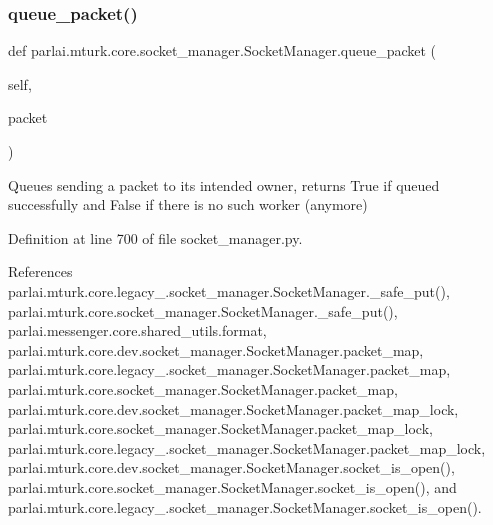 \subsubsection{\texorpdfstring{queue\+\_\+packet()}{queue\_packet()}}
{\footnotesize\ttfamily def parlai.\+mturk.\+core.\+socket\+\_\+manager.\+Socket\+Manager.\+queue\+\_\+packet (\begin{DoxyParamCaption}\item[{}]{self,  }\item[{}]{packet }\end{DoxyParamCaption})}

\begin{DoxyVerb}Queues sending a packet to its intended owner, returns True if
queued successfully and False if there is no such worker (anymore)
\end{DoxyVerb}
 

Definition at line 700 of file socket\+\_\+manager.\+py.



References parlai.\+mturk.\+core.\+legacy\+\_.\+socket\+\_\+manager.\+Socket\+Manager.\+\_\+safe\+\_\+put(), parlai.\+mturk.\+core.\+socket\+\_\+manager.\+Socket\+Manager.\+\_\+safe\+\_\+put(), parlai.\+messenger.\+core.\+shared\+\_\+utils.\+format, parlai.\+mturk.\+core.\+dev.\+socket\+\_\+manager.\+Socket\+Manager.\+packet\+\_\+map, parlai.\+mturk.\+core.\+legacy\+\_.\+socket\+\_\+manager.\+Socket\+Manager.\+packet\+\_\+map, parlai.\+mturk.\+core.\+socket\+\_\+manager.\+Socket\+Manager.\+packet\+\_\+map, parlai.\+mturk.\+core.\+dev.\+socket\+\_\+manager.\+Socket\+Manager.\+packet\+\_\+map\+\_\+lock, parlai.\+mturk.\+core.\+socket\+\_\+manager.\+Socket\+Manager.\+packet\+\_\+map\+\_\+lock, parlai.\+mturk.\+core.\+legacy\+\_.\+socket\+\_\+manager.\+Socket\+Manager.\+packet\+\_\+map\+\_\+lock, parlai.\+mturk.\+core.\+dev.\+socket\+\_\+manager.\+Socket\+Manager.\+socket\+\_\+is\+\_\+open(), parlai.\+mturk.\+core.\+socket\+\_\+manager.\+Socket\+Manager.\+socket\+\_\+is\+\_\+open(), and parlai.\+mturk.\+core.\+legacy\+\_.\+socket\+\_\+manager.\+Socket\+Manager.\+socket\+\_\+is\+\_\+open().

